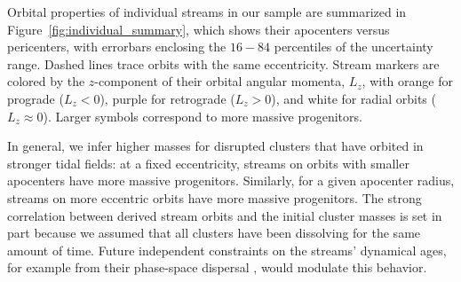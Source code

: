 \documentclass[twocolumn]{aastex63}
\begin{document}
Orbital properties of individual streams in our sample are summarized in Figure~\ref{fig:individual_summary}, which shows their apocenters versus pericenters, with errorbars enclosing the $16-84$ percentiles of the uncertainty range.
Dashed lines trace orbits with the same eccentricity.
Stream markers are colored by the $z$-component of their orbital angular momenta, $L_z$, with orange for prograde ($L_z<0$), purple for retrograde ($L_z>0$), and white for radial orbits ($L_z\approx0$).
Larger symbols correspond to more massive progenitors.

In general, we infer higher masses for disrupted clusters that have orbited in stronger tidal fields: at a fixed eccentricity, streams on orbits with smaller apocenters have more massive progenitors.
Similarly, for a given apocenter radius, streams on more eccentric orbits have more massive progenitors.
The strong correlation between derived stream orbits and the initial cluster masses is set in part because we assumed that all clusters have been dissolving for the same amount of time.
Future independent constraints on the streams' dynamical ages, for example from their phase-space dispersal \citep{buckley:2019},  would modulate this behavior.
\end{document}
